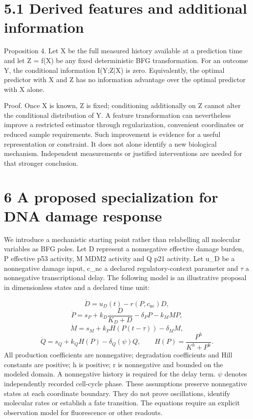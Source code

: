 \documentclass[11pt,a4paper]{article}
\begin{document}
\section*{5.1 Derived features and additional information}
Proposition 4. Let X be the full measured history available at a prediction time and let Z = f(X) be any fixed deterministic BFG transformation. For an outcome Y, the conditional information I(Y;Z|X) is zero. Equivalently, the optimal predictor with X and Z has no information advantage over the optimal predictor with X alone.

Proof. Once X is known, Z is fixed; conditioning additionally on Z cannot alter the conditional distribution of Y. A feature transformation can nevertheless improve a restricted estimator through regularization, convenient coordinates or reduced sample requirements. Such improvement is evidence for a useful representation or constraint. It does not alone identify a new biological mechanism. Independent measurements or justified interventions are needed for that stronger conclusion.

\section*{6 A proposed specialization for DNA damage response}
We introduce a mechanistic starting point rather than relabelling all molecular variables as BFG poles. Let D represent a nonnegative effective damage burden, P effective p53 activity, M MDM2 activity and Q p21 activity. Let u\_D be a nonnegative damage input, c\_nc a declared regulatory-context parameter and $\tau$ a nonnegative transcriptional delay. The following model is an illustrative proposal in dimensionless states and a declared time unit:

\begin{equation}\dot D=u_D(t)-r(P,c_{\mathrm{nc}})D,\tag{7}\end{equation}
\begin{equation}\dot P=s_P+k_D\frac{D}{K_D+D}-\delta_PP-k_MMP,\tag{8}\end{equation}
\begin{equation}\dot M=s_M+k_PH(P(t-\tau))-\delta_MM,\tag{9}\end{equation}
\begin{equation}\dot Q=s_Q+k_QH(P)-\delta_Q(\psi)Q,\qquad H(P)=\frac{P^h}{K^h+P^h}.\tag{10}\end{equation}
All production coefficients are nonnegative; degradation coefficients and Hill constants are positive; h is positive; r is nonnegative and bounded on the modeled domain. A nonnegative history is required for the delay term. $\psi$ denotes independently recorded cell-cycle phase. These assumptions preserve nonnegative states at each coordinate boundary. They do not prove oscillations, identify molecular rates or establish a fate transition. The equations require an explicit observation model for fluorescence or other readouts.
\end{document}
